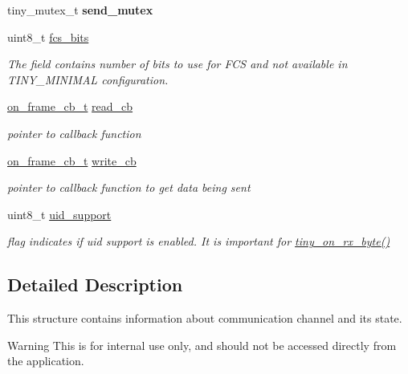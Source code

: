 \begin{DoxyCompactItemize}
tiny\+\_\+mutex\+\_\+t {\bfseries send\+\_\+mutex}
\item 
\mbox{\label{structSTinyData_a3cf4d6009cc472630e20a68d6fa50186}} 
uint8\+\_\+t \hyperlink{structSTinyData_a3cf4d6009cc472630e20a68d6fa50186}{fcs\+\_\+bits}
\begin{DoxyCompactList}\small\item\em The field contains number of bits to use for F\+CS and not available in T\+I\+N\+Y\+\_\+\+M\+I\+N\+I\+M\+AL configuration. \end{DoxyCompactList}\item 
\hyperlink{tiny__types_8h_ad6bf709565b8aecb9e6ecf196f219d54}{on\+\_\+frame\+\_\+cb\+\_\+t} \hyperlink{structSTinyData_a31ba50154472c11e0d063b0aeef95f4d}{read\+\_\+cb}
\begin{DoxyCompactList}\small\item\em pointer to callback function \end{DoxyCompactList}\item 
\hyperlink{tiny__types_8h_ad6bf709565b8aecb9e6ecf196f219d54}{on\+\_\+frame\+\_\+cb\+\_\+t} \hyperlink{structSTinyData_ada334c88e86bfd2c10191f65818c3fb3}{write\+\_\+cb}
\begin{DoxyCompactList}\small\item\em pointer to callback function to get data being sent \end{DoxyCompactList}\item 
\mbox{\label{structSTinyData_aa004bdc7db38cbbef4df4a4d94ca6a4b}} 
uint8\+\_\+t \hyperlink{structSTinyData_aa004bdc7db38cbbef4df4a4d94ca6a4b}{uid\+\_\+support}
\begin{DoxyCompactList}\small\item\em flag indicates if uid support is enabled. It is important for \hyperlink{group__ADVANCED__API_gaaf9bf6423bd0b8388c3387225b805278}{tiny\+\_\+on\+\_\+rx\+\_\+byte()} \end{DoxyCompactList}\end{DoxyCompactItemize}


\subsection{Detailed Description}
This structure contains information about communication channel and its state. \begin{DoxyWarning}{Warning}
This is for internal use only, and should not be accessed directly from the application. 
\end{DoxyWarning}


